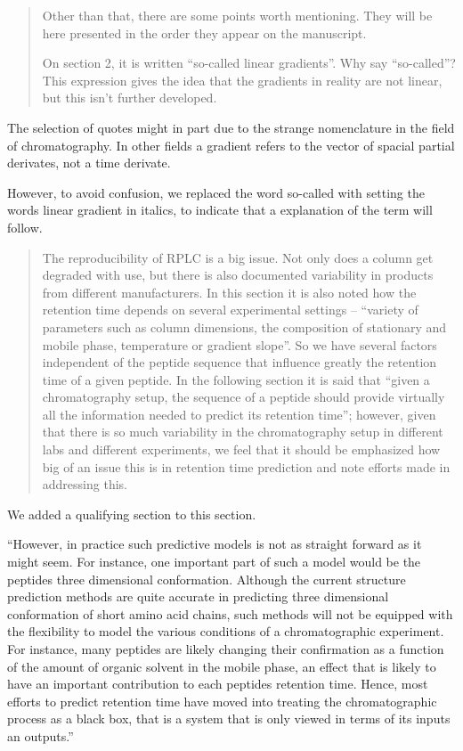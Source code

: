 \documentclass[letterpaper]{article}
\newcommand{\breview}{\begin{quotation}\begin{bf}\noindent}
\newcommand{\ereview}{\end{bf}\end{quotation}}
\begin{document}
\breview


Other than that, there are some points worth mentioning. They will be
here presented in the order they appear on the manuscript.

On section 2, it is written ``so-called linear gradients''. Why say
``so-called''? This expression gives the idea that the gradients in
reality are not linear, but this isn’t further developed.

\ereview

The selection of quotes might in part due to the strange nomenclature
in the field of chromatography. In other fields a gradient refers to
the vector of spacial partial derivates, not a time derivate.

However, to avoid confusion, we replaced the word so-called with
setting the words linear gradient in italics, to indicate that a
explanation of the term will follow. 

\breview

The reproducibility of RPLC is a big issue. Not only does a column get
degraded with use, but there is also documented variability in
products from different manufacturers. In this section it is also
noted how the retention time depends on several experimental settings
– ``variety of parameters such as column dimensions, the composition
of stationary and mobile phase, temperature or gradient slope''. So we
have several factors independent of the peptide sequence that
influence greatly the retention time of a given peptide. In the
following section it is said that ``given a chromatography setup, the
sequence of a peptide should provide virtually all the information
needed to predict its retention time''; however, given that there is
so much variability in the chromatography setup in different labs and
different experiments, we feel that it should be emphasized how big of
an issue this is in retention time prediction and note efforts made in
addressing this.

\ereview
We added a qualifying section to this section.

``However, in practice such predictive models is not as straight
forward as it might seem. For instance, one important part of such a
model would be the peptides three dimensional conformation. Although
the current structure prediction methods are quite accurate in
predicting three dimensional conformation of short amino acid chains,
such methods will not be equipped with the flexibility to model the
various conditions of a chromatographic experiment. For instance, many
peptides are likely changing their confirmation as a function of the
amount of organic solvent in the mobile phase, an effect that is
likely to have an important contribution to each peptides retention
time. Hence, most efforts to predict retention time have moved into
treating the chromatographic process as a black box, that is a system
that is only viewed in terms of its inputs an outputs.''
\end{document}
